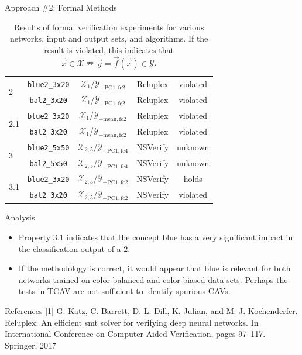 \documentclass[final]{beamer}
\begin{document}
\begin{frame}[fragile]{}
\begin{textblock}{\colwidth}
\begin{paddedBlock}{Approach \#2: Formal Methods}
\begin{table}
{\begin{tabular}{lcccc}
\multirow{2}{*}{2} & \texttt{blue2\_3x20} & $\mathcal{X}_1$/$\mathcal{Y}_{+ \text{PC1}, \text{fc2}}$ &  Reluplex &  violated \\
                   & \texttt{bal2\_3x20} & $\mathcal{X}_1$/$\mathcal{Y}_{+ \text{PC1}, \text{fc2}}$ &  Reluplex &  violated \\
\hline
\multirow{2}{*}{2.1} & \texttt{blue2\_3x20} & $\mathcal{X}_1$/$\mathcal{Y}_{+ \text{mean}, \text{fc2}}$ &  Reluplex &  violated \\
                   & \texttt{bal2\_3x20} & $\mathcal{X}_1$/$\mathcal{Y}_{+ \text{mean}, \text{fc2}}$ &  Reluplex &  violated \\
\hline
\multirow{2}{*}{3} & \texttt{blue2\_5x50} & $\mathcal{X}_{2,5}$/$\mathcal{Y}_{+ \text{PC1}, \text{fc4}}$ &  NSVerify &  unknown \\
                   & \texttt{bal2\_5x50} & $\mathcal{X}_{2,5}$/$\mathcal{Y}_{+ \text{PC1}, \text{fc4}}$ &  NSVerify &  unknown \\
\hline
\multirow{2}{*}{3.1} & \texttt{blue2\_3x20} & $\mathcal{X}_{2,5}$/$\mathcal{Y}_{+ \text{PC1}, \text{fc2}}$ &  NSVerify &  holds \\
                   & \texttt{bal2\_3x20} & $\mathcal{X}_{2,5}$/$\mathcal{Y}_{+ \text{PC1}, \text{fc2}}$ &  NSVerify &  violated \\
\hline
\end{tabular}
}
\caption{Results of formal verification experiments for various networks, input and output sets, and algorithms. If the result is violated, this indicates that $\vec x \in \mathcal{X} \nRightarrow \vec y = \vec f(\vec x) \in \mathcal{Y}$.}
\label{table:properties}
\end{table}

\alert{Analysis}

\begin{itemize}
  \item Property 3.1 indicates that the concept blue has a very significant impact in the classification output of a $2$.
  \item If the methodology is correct, it would appear that blue is relevant for both networks trained on color-balanced and color-biased data sets. Perhaps the tests in TCAV are not sufficient to identify spurious CAVs.
\end{itemize}

\end{paddedBlock}


\begin{paddedBlock}{References}
\footnotesize{[1] G. Katz, C. Barrett, D. L. Dill, K. Julian, and M. J. Kochenderfer. Reluplex: An efficient smt solver for verifying deep neural networks. In International Conference on Computer Aided Verification, pages 97–117. Springer, 2017}


\end{paddedBlock}
\end{textblock}
\end{frame}
\end{document}
